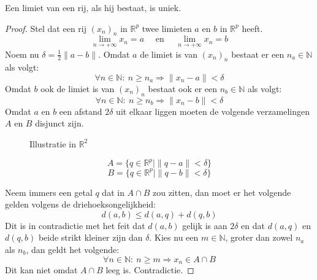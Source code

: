 \documentclass[main.tex]{subfiles}
\begin{document}
\begin{st}
  Een limiet van een rij, als hij bestaat, is uniek.

  \begin{proof}
    Stel dat een rij $(x_{n})_{n}$ in $\mathbb{R}^{p}$ twee limieten $a$ en $b$ in $\mathbb{R}^{p}$ heeft.
    \[ \lim_{n\rightarrow +\infty}x_{n} = a \quad\text{ en }\quad \lim_{n\rightarrow +\infty}x_{n} = b \]
    Noem nu $\delta = \frac{1}{2}\|a-b\|$.
    Omdat $a$ de limiet is van $(x_{n})_{n}$ bestaat er een $n_{a} \in \mathbb{N}$ als volgt:
    \[ \forall n\in \mathbb{N}:\ n \ge n_{a} \Rightarrow \|x_{n}-a\| < \delta \]
    Omdat $b$ ook de limiet is van $(x_{n})_{n}$ bestaat ook er een $n_{b} \in \mathbb{N}$ als volgt:
    \[ \forall n\in \mathbb{N}:\ n \ge n_{b} \Rightarrow \|x_{n}-b\| < \delta \]
    Omdat $a$ en $b$ een afstand $2\delta$ uit elkaar liggen moeten de volgende verzamelingen $A$ en $B$ disjunct zijn.

    \noindent
    \begin{minipage}{.45\textwidth}
      \begin{figure}[H]
        \centering
        \caption{Illustratie in $\mathbb{R}^{2}$}
      \end{figure}
    \end{minipage}
    \begin{minipage}{.45\textwidth}
      \[ A = \{ q \in \mathbb{R}^{p} \mid \|q-a\| < \delta \} \]
      \[ B = \{ q \in \mathbb{R}^{p} \mid \|q-b\| < \delta \} \]
    \end{minipage}
    
    \noindent
    Neem immers een getal $q$ dat in $A \cap B$ zou zitten, dan moet er het volgende gelden volgens de driehoeksongelijkheid:
    \[ d(a,b) \le d(a,q) + d(q,b) \]
    Dit is in contradictie met het feit dat $d(a,b)$ gelijk is aan $2\delta$ en dat $d(a,q)$ en $d(q,b)$ beide strikt kleiner zijn dan $\delta$.
    Kies nu een $m\in \mathbb{N}$, groter dan zowel $n_{a}$ als $n_{b}$, dan geldt het volgende:
    \[ \forall n \in \mathbb{N}:\ n \ge m \Rightarrow x_{n} \in A \cap B \]
    Dit kan niet omdat $A\cap B$ leeg is.
    Contradictie.
  \end{proof}
\feed
\end{st}
\end{document}

